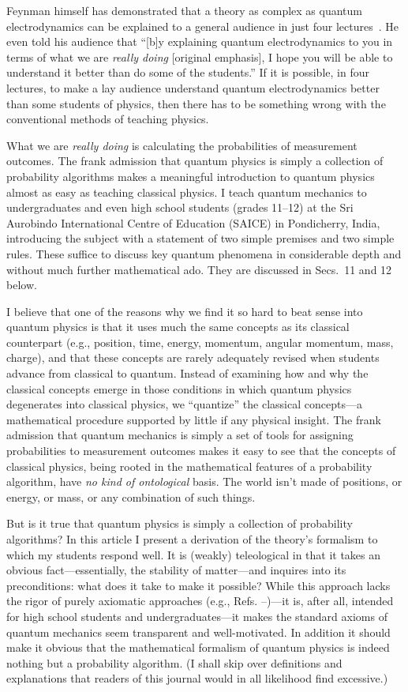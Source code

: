 \documentclass[12pt]{article}
\begin{document}
Feynman himself has demonstrated that a theory as complex as quantum electrodynamics can be explained to a general audience in just four lectures~\cite{QED}. He even told his audience that ``[b]y explaining quantum electrodynamics to you in terms of what we are \textit{really doing} [original emphasis], I hope you will be able to understand it better than do some of the students.'' If it is possible, in four lectures, to make a lay audience understand quantum electrodynamics better than some students of physics, then there has to be something wrong with the conventional methods of teaching physics.

What we are \textit{really doing} is calculating the probabilities of measurement outcomes. The frank admission that quantum physics is simply a collection of probability algorithms makes a meaningful introduction to quantum physics almost as easy as teaching classical physics. I teach quantum mechanics to undergraduates and even high school students (grades 11--12) at the Sri Aurobindo International Centre of Education (SAICE) in Pondicherry, India, introducing the subject with a statement of two simple premises and two simple rules. These suffice to discuss key quantum phenomena in considerable depth and without much further mathematical ado. They are discussed in Secs.~11 and 12 below.

I believe that one of the reasons why we find it so hard to beat sense into quantum physics is that it uses much the same concepts as its classical counterpart (e.g., position, time, energy, momentum, angular momentum, mass, charge), and that these concepts are rarely adequately revised when students advance from classical to quantum. Instead of examining how and why the classical concepts emerge in those conditions in which quantum physics degenerates into classical physics, we ``quantize'' the classical concepts---a mathematical procedure supported by little if any physical insight. The frank admission that quantum mechanics is simply a set of tools for assigning probabilities to measurement outcomes makes it easy to see that the concepts of classical physics, being rooted in the mathematical features of a probability algorithm, have \textit{no kind of ontological} basis. The world isn't made of positions, or energy, or mass, or any combination of such things.

But is it true that quantum physics is simply a collection of probability algorithms? In this article I present 
a derivation of the theory's formalism to which my students respond well. It is (weakly) teleological in that it takes an obvious fact---essentially, the stability of matter---and inquires into its preconditions: what does it take to make it possible? While this approach lacks the rigor of purely axiomatic approaches (e.g., Refs. \cite{Mackey}--\cite{Pitowsky89})---it is, after all, intended for high school students and undergraduates---it makes the standard axioms of quantum mechanics seem transparent and well-motivated. In addition it should make it obvious that the mathematical formalism of quantum physics is indeed nothing but a probability algorithm. (I shall skip over definitions and explanations that readers of this journal would in all likelihood find excessive.)
\end{document}
